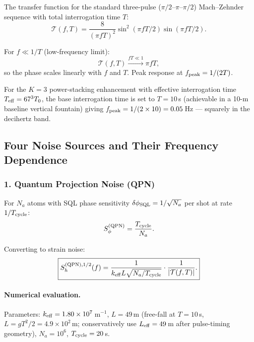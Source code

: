 \documentclass[11pt]{article}
\theoremstyle{definition}
\theoremstyle{remark}
\newcommand{\ee}[1]{\times10^{#1}}
\begin{document}
The transfer function for the standard three-pulse ($\pi/2$--$\pi$--$\pi/2$)
Mach--Zehnder sequence with total interrogation time $T$:
\begin{equation}
\mathcal{T}(f,T) = \frac{8}{(\pi f T)^2}\sin^2(\pi f T / 2)\sin(\pi f T / 2).
\label{eq:transfer-fn}
\end{equation}

For $f \ll 1/T$ (low-frequency limit):
\begin{equation}
\mathcal{T}(f,T) \xrightarrow{fT\ll1} \pi f T,
\end{equation}
so the phase scales linearly with $f$ and $T$.  Peak response at $f_{\rm peak}
= 1/(2T)$.

For the $K=3$ power-stacking enhancement with effective interrogation time
$T_{\rm eff} = 67^3 T_0$, the base interrogation time is set to
$T = 10$\,s (achievable in a 10-m baseline vertical fountain) giving
$f_{\rm peak} = 1/(2\times10) = 0.05$\,Hz --- squarely in the decihertz band.

\subsection{Four Noise Sources and Their Frequency Dependence}

\subsubsection{1. Quantum Projection Noise (QPN)}

For $N_a$ atoms with SQL phase sensitivity $\delta\phi_{\rm SQL} = 1/\sqrt{N_a}$
per shot at rate $1/T_{\rm cycle}$:
\begin{equation}
S_\phi^{(\rm QPN)} = \frac{T_{\rm cycle}}{N_a}.
\end{equation}

Converting to strain noise:
\begin{equation}
\boxed{
S_h^{(\rm QPN),1/2}(f) = \frac{1}{k_{\rm eff} L \sqrt{N_a / T_{\rm cycle}}}
\cdot \frac{1}{|\mathcal{T}(f,T)|}.
}
\label{eq:QPN-floor}
\end{equation}

\paragraph{Numerical evaluation.}
Parameters: $k_{\rm eff} = 1.80\ee{7}$\,m$^{-1}$, $L = 49$\,m
(free-fall at $T=10$\,s, $L = gT^2/2 = 4.9\ee{2}$\,m; conservatively
use $L_{\rm eff} = 49$\,m after pulse-timing geometry), $N_a = 10^6$,
$T_{\rm cycle} = 20$\,s.
\end{document}
